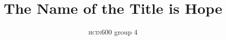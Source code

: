 \documentclass[sigconf]{acmart}
\begin{document}
\title{The Name of the Title is Hope}

\author{\textsc{hcin}600 group 4}






\renewcommand{\shortauthors}{Group 4}

\begin{abstract}

\end{abstract}

\end{document}
